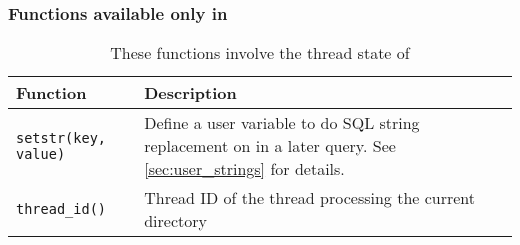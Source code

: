 \subsubsection{Functions available only in \gufiquery}

\begin{table}[H]
  \centering
  \caption{These functions involve the thread state of \gufiquery}
  \begin{tabularx}{\textwidth}{| l | X |}
    \hline
    Function & Description \\
    \hline
    \texttt{setstr(key, value)} & Define a user variable to do SQL string replacement on in a later query. See \ref{sec:user_strings} for details. \\
    \hline
    \texttt{thread\_id()} & Thread ID of the thread processing the current directory \\
    \hline
  \end{tabularx}
\end{table}

